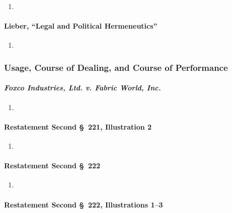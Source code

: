 \begin{enumerate}
    \item %
\end{enumerate}

\paragraph{Lieber, ``Legal and Political Hermeneutics''}

\begin{enumerate}
    \item %
\end{enumerate}

\subsubsection{Usage, Course of Dealing, and Course of Performance}

\paragraph{\emph{Foxco Industries, Ltd. v. Fabric World, Inc.}}

\begin{enumerate}
    \item %
\end{enumerate}

\paragraph{Restatement Second \S\ 221, Illustration 2}

\begin{enumerate}
    \item %
\end{enumerate}

\paragraph{Restatement Second \S\ 222}

\begin{enumerate}
    \item %
\end{enumerate}

\paragraph{Restatement Second \S\ 222, Illustrations 1--3}

